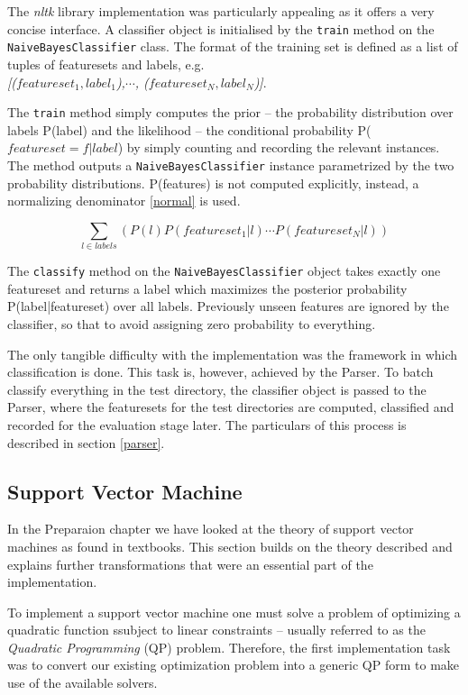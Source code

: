 \documentclass[12pt,notitlepage,twoside]{scrreprt}
\begin{document}
The \textit{nltk} library implementation was particularly appealing as it offers a very
concise interface. A classifier object is initialised by the \texttt{train}
method on the \texttt{NaiveBayesClassifier} class. The format of the training
set is defined as a list of tuples of featuresets and labels, e.g.
\\ \textit{[(\(featureset_1, label_1\)),\( \cdots\), (\(featureset_N,
label_N\))]}. 

The \texttt{train} method simply computes the prior -- the probability
distribution over labels P(label) and the likelihood -- the conditional
probability P(\(featureset=f|label\)) by simply counting and recording the
relevant instances. The method outputs a \texttt{NaiveBayesClassifier} instance
parametrized by the two probability distributions. P(features) is not
computed explicitly, instead, a normalizing denominator \ref{normal} is used.

\begin{equation} \sum_{l \in labels}(P(l)P(featureset_1|l)\cdots
  P(featureset_N|l)) \end{equation}

The \texttt{classify} method on the \texttt{NaiveBayesClassifier} object takes
exactly one featureset and returns a label which maximizes the posterior
probability P(label|featureset) over all labels.  Previously unseen features
are ignored by the classifier, so that to avoid assigning zero probability to
everything.

The only tangible difficulty with the implementation was the
framework in which classification is done. This task is, however, achieved by
the Parser.  To batch classify everything in the test directory, the classifier
object is passed to the Parser, where the featuresets for the test directories
are computed, classified and recorded for the evaluation stage later. The
particulars of this process is described in section \ref{parser}.

\subsection{Support Vector Machine} In the Preparaion chapter we have looked at
the theory of support vector machines as found in textbooks. This section
builds on the theory described and explains further transformations that were
an essential part of the implementation.

To implement a support vector
machine one must solve a problem of optimizing a quadratic function ssubject to
linear constraints -- usually referred to as the \textit{Quadratic
Programming} (QP) problem. Therefore, the first implementation task was to
convert our existing optimization problem into a generic QP form to make use of
the available solvers.
\end{document}
